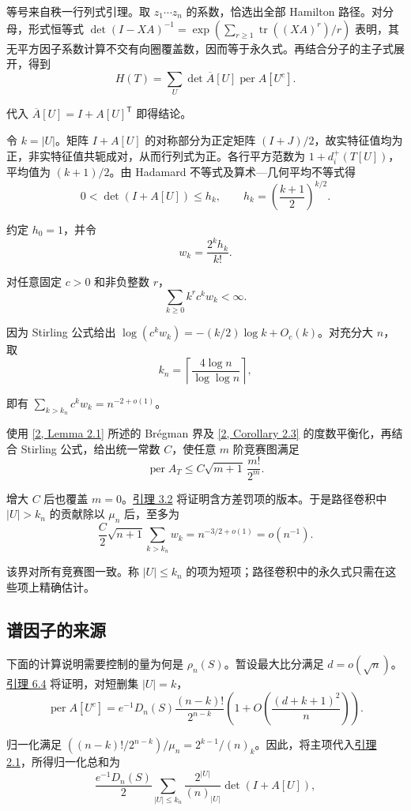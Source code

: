\documentclass[11pt,a4paper]{article}
\newcommand{\paperref}[2]{\hyperref[#1]{#2}}
\begin{document}
等号来自秩一行列式引理。取 \(z_1\cdots z_n\) 的系数，恰选出全部 Hamilton 路径。对分母，形式恒等式 \(\det(I-XA)^{-1}=\exp(\sum_{r\ge1}\operatorname{tr}((XA)^r)/r)\) 表明，其无平方因子系数计算不交有向圈覆盖数，因而等于永久式。再结合分子的主子式展开，得到
\[H(T)=\sum_U\det\overline A[U]\operatorname{per}A[U^c].\]

代入 \(\overline A[U]=I+A[U]^{\mathsf T}\) 即得结论。

令 \(k=|U|\)。矩阵 \(I+A[U]\) 的对称部分为正定矩阵 \((I+J)/2\)，故实特征值均为正，非实特征值共轭成对，从而行列式为正。各行平方范数为 \(1+d_i^+(T[U])\)，平均值为 \((k+1)/2\)。由 Hadamard 不等式及算术---几何平均不等式得
\[0<\det(I+A[U])\le h_k,\qquad h_k=\left(\frac{k+1}{2}\right)^{k/2}.\]

约定 \(h_0=1\)，并令
\[w_k=\frac{2^k h_k}{k!}.\]

对任意固定 \(c>0\) 和非负整数 \(r\)，
\[\sum_{k\ge0}k^r c^k w_k<\infty.\]

因为 Stirling 公式给出 \(\log(c^kw_k)=-(k/2)\log k+O_c(k)\)。对充分大 \(n\)，取
\[k_n=\left\lceil\frac{4\log n}{\log\log n}\right\rceil,\]

即有 \(\sum_{k>k_n}c^kw_k=n^{-2+o(1)}\)。

使用 \paperref{bib-2}{[2, Lemma 2.1]} 所述的 Brégman 界及 \paperref{bib-2}{[2, Corollary 2.3]} 的度数平衡化，再结合 Stirling 公式，给出统一常数 \(C\)，使任意 \(m\) 阶竞赛图满足
\[\operatorname{per}A_T\le C\sqrt{m+1}\,\frac{m!}{2^m}.\]

增大 \(C\) 后也覆盖 \(m=0\)。\paperref{thm-3.2}{引理 3.2} 将证明含方差罚项的版本。于是路径卷积中 \(|U|>k_n\) 的贡献除以 \(\mu_n\) 后，至多为
\[\frac C2\sqrt{n+1}\sum_{k>k_n}w_k
=n^{-3/2+o(1)}=o(n^{-1}).\]

该界对所有竞赛图一致。称 \(|U|\le k_n\) 的项为短项；路径卷积中的永久式只需在这些项上精确估计。

\subsection{谱因子的来源}\label{sec-2.3}

下面的计算说明需要控制的量为何是 \(\rho_n(S)\)。暂设最大比分满足 \(d=o(\sqrt n)\)。\paperref{thm-6.4}{引理 6.4} 将证明，对短删集 \(|U|=k\)，
\[\operatorname{per}A[U^c]
=e^{-1}D_n(S)\frac{(n-k)!}{2^{n-k}}
\left(1+O\left(\frac{(d+k+1)^2}{n}\right)\right).\]

归一化满足 \(((n-k)!/2^{n-k})/\mu_n=2^{k-1}/(n)_k\)。因此，将主项代入\paperref{thm-2.1}{引理 2.1}，所得归一化总和为
\[\frac{e^{-1}D_n(S)}2
\sum_{|U|\le k_n}\frac{2^{|U|}}{(n)_{|U|}}\det(I+A[U]),\]
\end{document}
